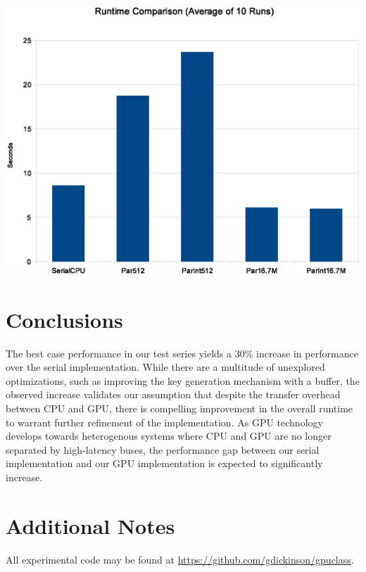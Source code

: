 \documentclass[twocolumn]{article}
\begin{document}
  \includegraphics[scale=0.40]{gpuruntimes.eps} 

  \section{Conclusions}
   The best case performance in our test series yields a 30\% increase in performance over the serial implementation.  While there are a multitude of unexplored optimizations, such as improving the key generation mechanism with a buffer, the observed increase validates our assumption that despite the transfer overhead between CPU and GPU, there is compelling improvement in the overall runtime to warrant further refinement of the implementation.  As GPU technology develops towards heterogenous systems where CPU and GPU are no longer separated by high-latency buses, the performance gap between our serial implementation and our GPU implementation is expected to significantly increase.

  \section{Additional Notes}
  All experimental code may be found at \url{https://github.com/gdickinson/gpuclass}.
  
  {}
  
  
\end{document}
